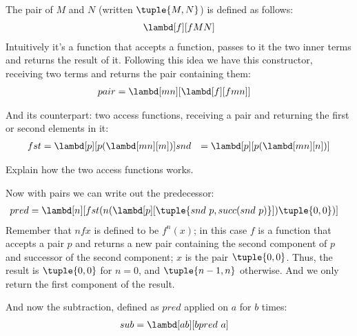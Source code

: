 \documentclass[../../../include/open-logic-section]{subfiles}
\begin{document}

The pair of $M$ and $N$ (written $\tuple{M,N}$) is defined as follows:
\begin{align*}
  \lambd[f][fMN]
\end{align*}
Intuitively it's a function that accepts a function, passes to it the
two inner terms and returns the result of it. Following this idea we
have this constructor, receiving two terms and returns the pair
containing them:
\begin{align*}
  {pair} &= \lambd[mn][\lambd[f][fmn]]
\end{align*}

And its counterpart: two access functions, receiving a pair and
returning the first or second elements in it:
\begin{align*}
  {fst} &= \lambd[p][p(\lambd[mn][m])]
  {snd} &= \lambd[p][p(\lambd[mn][n])]
\end{align*}

\begin{prob}
  Explain how the two access functions works.
\end{prob}

Now with pairs we can write out the predecessor:
\begin{align*}
  {pred} &= \lambd[n][{fst}(n (\lambd[p][\tuple{{snd}~ {p}, {succ}({snd} ~{p})}]) \tuple{0, 0})]
\end{align*}
Remember that $n f x$ is defined to be $f^{n}(x)$; in this
case $f$ is a function that accepts a pair $p$ and returns a new
pair containing the second component of $p$ and successor of the
second component; $x$ is the pair $\tuple{0,0}$. Thus, the
result is $\tuple{0,0}$ for $n=0$, and $\tuple{{n-1}, n}$
otherwise. And we only return the first component of the result.

And now the subtraction, defined as $pred$ applied on $a$ for $b$ times:
\begin{align*}
  {sub} &= \lambd[ab][b {pred} ~ a]
\end{align*}
\end{document}
